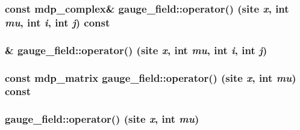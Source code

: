 \label{classgauge__field_a8d68963fa439cf58c3ac16c043523010}
\hypertarget{classgauge__field_a3d76d90e8a6f39b0897cf463d6d8d049}{
\subsubsection[{operator()}]{\setlength{\rightskip}{0pt plus 5cm}const {\bf mdp\_\-complex}\& gauge\_\-field::operator() (site {\em x}, \/  int {\em mu}, \/  int {\em i}, \/  int {\em j}) const}}
\label{classgauge__field_a3d76d90e8a6f39b0897cf463d6d8d049}
\hypertarget{classgauge__field_a60a42ee4e59ad13f7bab46ba6f4ef2d9}{
\subsubsection[{operator()}]{\& gauge\_\-field::operator() (site {\em x}, \/  int {\em mu}, \/  int {\em i}, \/  int {\em j})}}
\label{classgauge__field_a60a42ee4e59ad13f7bab46ba6f4ef2d9}
\hypertarget{classgauge__field_a8bbf9acb59886d8fcd08973476f224f6}{
\subsubsection[{operator()}]{\setlength{\rightskip}{0pt plus 5cm}const {\bf mdp\_\-matrix} gauge\_\-field::operator() (site {\em x}, \/  int {\em mu}) const}}
\label{classgauge__field_a8bbf9acb59886d8fcd08973476f224f6}
\hypertarget{classgauge__field_a765260519dece4a4ffafa338cbee22ae}{
\subsubsection[{operator()}]{ gauge\_\-field::operator() (site {\em x}, \/  int {\em mu})}}
